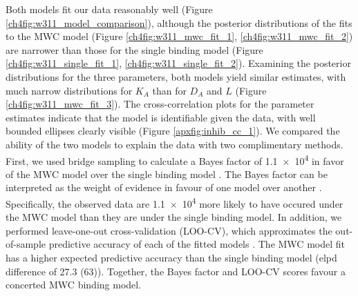 Both models fit our data reasonably well (Figure \ref{ch4fig:w311_model_comparison}), although the posterior distributions of the fits to the MWC model (Figure \ref{ch4fig:w311_mwc_fit_1}, \ref{ch4fig:w311_mwc_fit_2}) are narrower than those for the single binding model (Figure \ref{ch4fig:w311_single_fit_1}, \ref{ch4fig:w311_single_fit_2}).
Examining the posterior distributions for the three parameters, both models yield similar estimates, with much narrow distributions for $K_A$ than for $D_A$ and $L$ (Figure \ref{ch4fig:w311_mwc_fit_3}).
The cross-correlation plots for the parameter estimates indicate that the model is identifiable given the data, with well bounded ellipses clearly visible (Figure \ref{apxfig:inhib_cc_1}).
We compared the ability of the two models to explain the data with two complimentary methods.
First, we used bridge sampling to calculate a Bayes factor of \num{1.1e4} in favor of the MWC model over the single binding model \cite{gronau_bridgesampling_2020}.
The Bayes factor can be interpreted as the weight of evidence in favour of one model over another \cite{wagenmakers_practical_2007}.
Specifically, the observed data are \num{1.1e4} more likely to have occured under the MWC model than they are under the single binding model.
In addition, we performed leave-one-out cross-validation (LOO-CV), which approximates the out-of-sample predictive accuracy of each of the fitted models \cite{vehtari_practical_2017}.
The MWC model fit has a higher expected predictive accuracy than the single binding model (elpd difference of \num{27.3 (63)}).
Together, the Bayes factor and LOO-CV scores favour a concerted MWC binding model.

